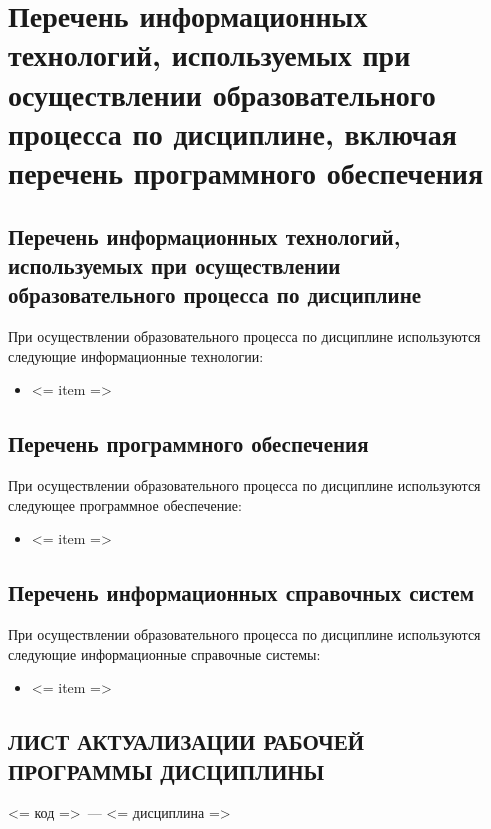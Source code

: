 \documentclass[a4paper,12pt]{article}
\begin{document}
\section{Перечень информационных технологий, используемых при осуществлении образовательного процесса по дисциплине, включая перечень программного обеспечения%
}

\subsection{Перечень информационных технологий, используемых при осуществлении образовательного процесса по дисциплине}

При осуществлении образовательного процесса по дисциплине используются следующие информационные технологии:
\begin{itemize}[nolistsep]
\item <= item =>
\end{itemize}

\subsection{Перечень программного обеспечения}
При осуществлении образовательного процесса по дисциплине используются следующее программное обеспечение:
\begin{itemize}[nolistsep]
\item <= item =>
\end{itemize}

\subsection{Перечень информационных справочных систем}
При осуществлении образовательного процесса по дисциплине используются следующие информационные справочные системы:
\begin{itemize}[nolistsep]
\item <= item =>
\end{itemize}

\newpage
\begin{center}
\section*{ЛИСТ АКТУАЛИЗАЦИИ РАБОЧЕЙ ПРОГРАММЫ ДИСЦИПЛИНЫ}
<= код =>\ --- <= дисциплина => 
\end{center}
\end{document}
